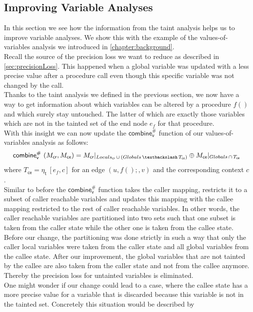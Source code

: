     \subsection{Improving Variable Analyses}\label{sec:formalImprove}
    In this section we see how the information from the taint analysis helps us to improve variable analyses. We show this with the example of the values-of-variables analysis we introduced in \autoref{chapter:background}.\\
    Recall the source of the precision loss we want to reduce as described in \autoref{sec:precisionLoss}. This happened when a global variable was updated with a less precise value after a procedure call even though this specific variable was not changed by the call.\\
    Thanks to the taint analysis we defined in the previous section, we now have a way to get information about which variables can be altered by a procedure $f()$ and which surely stay untouched. The latter of which are exactly those variables which are not in the tainted set of the end node $e_f$ for that procedure.\\
    With this insight we can now update the $\textsf{combine}^{\#}_\textsf{v}$ function of our values-of-variables analysis as follows:
    \[
      \textsf{combine}^{\#}_\textsf{v}\ (M_\textsf{cr}, M_\textsf{ce}) = M_\textsf{cr}|_{Locals_\textsf{cr}\, \cup\, (Globals\, \textbackslash\, T_\textsf{ce})} \oplus M_\textsf{ce}|_{Globals\, \cap\, T_\textsf{ce}}
    \]
    where $T_\textsf{ce} = \eta_\textsf{t}\ [e_f, c]$ for an edge $(u, f();, v)$ and the corresponding context $c$.\\
    Similar to before the $\textsf{combine}^{\#}_\textsf{v}$ function takes the caller mapping, restricts it to a subset of caller reachable variables and updates this mapping with the callee mapping restricted to the rest of caller reachable variables. In other words, the caller reachable variables are partitioned into two sets such that one subset is taken from the caller state while the other one is taken from the callee state. Before our change, the partitioning was done strictly in such a way that only the caller local variables were taken from the caller state and all global variables from the callee state. After our improvement, the global variables that are not tainted by the callee are also taken from the caller state and not from the callee anymore. Thereby the precision loss for untainted variables is eliminated.
    \\
    One might wonder if our change could lead to a case, where the callee state has a more precise value for a variable that is discarded because this variable is not in the tainted set. Concretely this situation would be described by 
